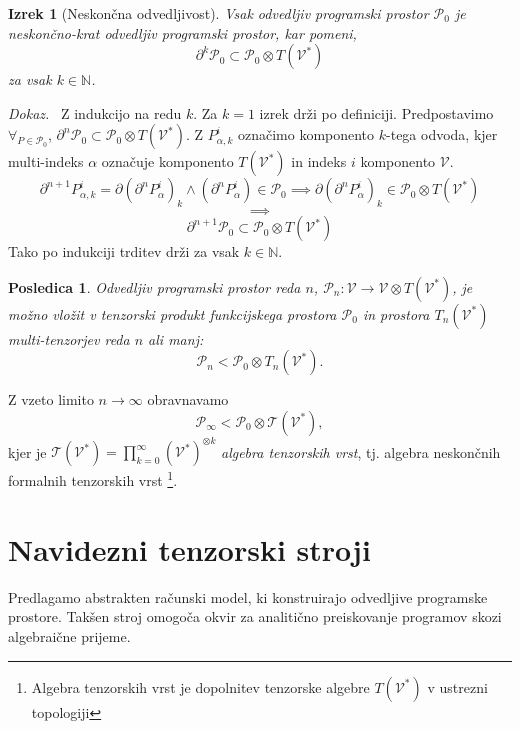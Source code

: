 \documentclass[a4paper, 12pt]{book}
\newcommand{\T}{\mathcal{T}}
\newcommand{\VV}{\mathcal{V}}
\newcommand{\dP}{\mathcal{P}}
\newcommand{\D}{\partial}
\newtheorem{posledica}{Posledica}[chapter]
\newtheorem{izrek}{Izrek}[chapter]
\newenvironment{dokaz}{\emph{Dokaz.}\ }{\hspace{\fill}{$\Box$}}
\begin{document}
\begin{izrek}[Neskončna odvedljivost]\label{thm:infDif}
Vsak odvedljiv programski prostor $\dP_0$ je neskončno-krat odvedljiv programski prostor, kar pomeni,
\begin{equation}\label{eq:P_n}
	 		\D^k\dP_0\subset\dP_0\otimes T(\VV^*)
	 	\end{equation}
za vsak $k\in\mathbb{N}$.
\end{izrek}
\begin{dokaz}
Z indukcijo na redu $k$. Za $k=1$ izrek drži po definiciji. Predpostavimo $\forall_{P\in\dP_0}$,
  $\D^n\dP_0\subset\dP_0\otimes T(\VV^*)$. Z $P_{\alpha,k}^i$ označimo komponento $k$-tega odvoda, kjer multi-indeks $\alpha$ označuje komponento $T(\VV^*)$ in indeks $i$ komponento $\VV$.
	\begin{equation}\label{eq:inductionStep}
\D^{n+1}P_{\alpha,k}^i=\D(\D^n P^i_\alpha)_k\land(\D^n P^i_\alpha)\in\dP_0\implies \D(\D^n P^i_\alpha)_k\in \dP_0\otimes T(\VV^*)
	\end{equation}
	$$\implies$$
	$$\D^{n+1}\dP_0\subset\dP_0\otimes T(\VV^*)$$
Tako po indukciji trditev drži za vsak $k\in\mathbb{N}$.
\end{dokaz}
\begin{posledica}\label{tenProdEmb}
Odvedljiv programski prostor reda $n$, $\dP_n:\VV\to\VV\otimes T(\VV^*)$, je možno vložit v tenzorski produkt funkcijskega prostora $\dP_0$ in prostora $T_n(\VV^*)$ multi-tenzorjev reda $n$ ali manj:
\begin{equation}
    \label{eq:D_p_embed}
    \dP_n<\dP_0\otimes T_n(\VV^*).
  \end{equation}
\end{posledica}

Z vzeto limito $n\to\infty$ obravnavamo
\begin{equation}
 	\label{eq:P_algebra}
 	 	    \dP_\infty < \dP_0\otimes \T(\VV^*),
 	\end{equation}
kjer je $\T(\VV^*)=\prod_{k=0}^\infty (\VV^*)^{\otimes k}$ \emph{algebra tenzorskih vrst}, tj. algebra neskončnih formalnih tenzorskih vrst \footnote{Algebra tenzorskih vrst je dopolnitev tenzorske algebre $T(\VV^*)$ v ustrezni topologiji}.

\section{Navidezni tenzorski stroji}

Predlagamo abstrakten računski model, ki konstruirajo odvedljive programske prostore. Takšen stroj omogoča okvir za analitično preiskovanje programov skozi algebraične prijeme.
\end{document}
